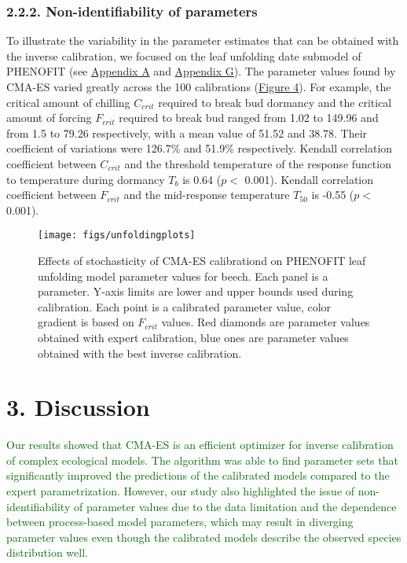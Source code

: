 \documentclass[11pt,]{article}
\begin{document}
\hypertarget{non-identifiability-of-parameters}{%
\subsubsection{2.2.2. Non-identifiability of
parameters}\label{non-identifiability-of-parameters}}

To illustrate the variability in the parameter estimates that can be
obtained with the inverse calibration, we focused on the leaf unfolding
date submodel of PHENOFIT (see \protect\hyperlink{appendixA}{Appendix A}
and \protect\hyperlink{appendixG}{Appendix G}). The parameter values
found by CMA-ES varied greatly across the 100 calibrations
(\hyperref[fig:unfoldingplots]{Figure 4}). For example, the critical
amount of chilling \(C_{crit}\) required to break bud dormancy and the
critical amount of forcing \(F_{crit}\) required to break bud ranged
from 1.02 to 149.96 and from 1.5 to 79.26 respectively, with a mean
value of 51.52 and 38.78. Their coefficient of variations were 126.7\%
and 51.9\% respectively. Kendall correlation coefficient between
\(C_{crit}\) and the threshold temperature of the response function to
temperature during dormancy \(T_b\) is 0.64 (\(p <\) 0.001). Kendall
correlation coefficient between \(F_{crit}\) and the mid-response
temperature \(T_{50}\) is -0.55 (\(p <\) 0.001).

\begin{figure}[H]

{\centering \texttt{[image: figs/unfoldingplots]} 

}

\caption{Effects of stochasticity of CMA-ES calibrationd on PHENOFIT leaf unfolding model parameter values for beech. Each panel is a parameter. Y-axis limits are lower and upper bounds used during calibration. Each point is a calibrated parameter value, color gradient is based on $F_{crit}$ values. Red diamonds are parameter values obtained with expert calibration, blue ones are parameter values obtained with the best inverse calibration.}\label{fig:unfoldingplots}
\end{figure}

\hypertarget{discussion}{%
\section{3. Discussion}\label{discussion}}

\textcolor{darkgreen}{Our results showed that CMA-ES is an efficient optimizer for inverse calibration of complex ecological models. The algorithm was able to find parameter sets that significantly improved the predictions of the calibrated models compared to the expert parametrization.  However, our study also highlighted the issue of non-identifiability of parameter values due to the data limitation and the dependence between process-based model parameters, which may result in diverging parameter values even though the calibrated models describe the observed species distribution well.}
\end{document}
